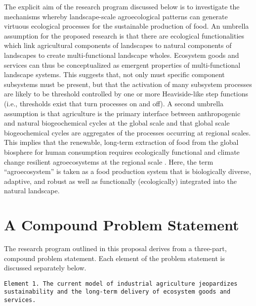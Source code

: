 \documentclass[twoside]{article}	%
\begin{document}
The explicit aim of the research program discussed below is to investigate the mechanisms whereby landscape-scale agroecological patterns can generate virtuous ecological processes for the sustainable production of food. An umbrella assumption for the proposed research is that there are ecological functionalities which link agricultural components of landscapes to natural components of landscapes to create multi-functional landscape wholes. Ecosystem goods and services can thus be conceptualized as emergent properties of multi-functional landscape systems. This suggests that, not only must specific component subsystems must be present, but that the activation of many subsystem processes are likely to be threshold controlled by one or more Heaviside-like step functions (i.e., thresholds exist that turn processes on and off). A second umbrella assumption is that agriculture is the primary interface between anthropogenic and natural biogeochemical cycles at the global scale and that global scale biogeochemical cycles are aggregates of the processes occurring at regional scales. This implies that the renewable, long-term extraction of food from the global biosphere for human consumption requires ecologically functional and climate change resilient agroecosystems at the regional scale \citep{barnosky_approaching_2012}.  Here, the term \enquote{agroecosystem} is taken as a food production system that is biologically diverse, adaptive, and robust as well as functionally (ecologically) integrated into the natural landscape.


\section{A Compound Problem Statement}
The research program outlined in this proposal derives from a three-part, compound problem statement. Each element of the problem statement is discussed separately below.\\ 

\begin{sloppypar}
\texttt{Element 1. The current model of industrial agriculture jeopardizes sustainability and the long-term delivery of ecosystem goods and services.}\\
\end{sloppypar}
\end{document}
